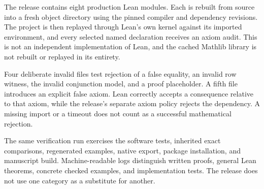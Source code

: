 The release contains eight production Lean modules. Each is rebuilt from source into a fresh object directory using the pinned compiler and dependency revisions. The project is then replayed through Lean's own kernel against its imported environment, and every selected named declaration receives an axiom audit. This is not an independent implementation of Lean, and the cached Mathlib library is not rebuilt or replayed in its entirety.

Four deliberate invalid files test rejection of a false equality, an invalid row witness, the invalid conjunction model, and a proof placeholder. A fifth file introduces an explicit false axiom. Lean correctly accepts a consequence relative to that axiom, while the release's separate axiom policy rejects the dependency. A missing import or a timeout does not count as a successful mathematical rejection.

The same verification run exercises the software tests, inherited exact comparisons, regenerated examples, native export, package installation, and manuscript build. Machine-readable logs distinguish written proofs, general Lean theorems, concrete checked examples, and implementation tests. The release does not use one category as a substitute for another.
